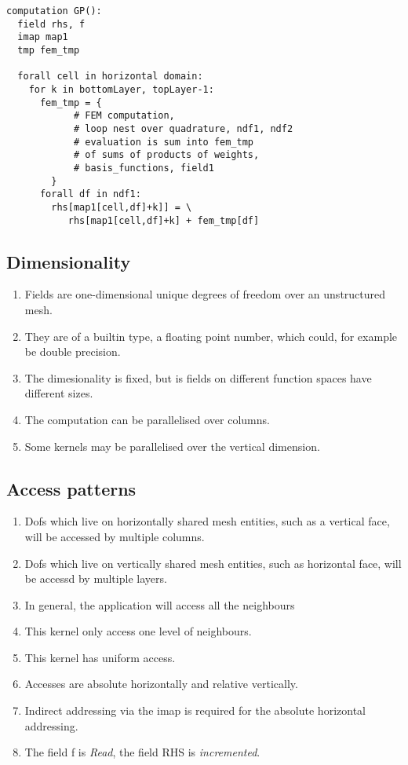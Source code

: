 \documentclass[a4paper,11pt]{report}
\begin{document}
\begin{lstlisting}[style=dsl]
computation GP():
  field rhs, f
  imap map1
  tmp fem_tmp

  forall cell in horizontal domain:
    for k in bottomLayer, topLayer-1:
      fem_tmp = {
            # FEM computation, 
            # loop nest over quadrature, ndf1, ndf2
            # evaluation is sum into fem_tmp
            # of sums of products of weights, 
            # basis_functions, field1
        }
      forall df in ndf1:
        rhs[map1[cell,df]+k]] = \ 
           rhs[map1[cell,df]+k] + fem_tmp[df]

\end{lstlisting}
\subsection{Dimensionality}
\begin{enumerate}
  \item Fields are one-dimensional unique degrees of freedom over an unstructured mesh.
  \item They are of a builtin type, a floating point number, which could, for example be double precision.
   \item The dimesionality is fixed, but is fields on different function spaces have different sizes.
   \item The computation can be parallelised over columns. 
   \item Some kernels may be parallelised over the vertical dimension.
\end{enumerate}

\subsection{Access patterns}
  \begin{enumerate}
     \item Dofs which live on horizontally shared mesh entities, such as a
       vertical face, will be accessed by multiple columns.
     \item Dofs which live on vertically shared mesh entities, such as
       horizontal face, will be accessd by multiple layers.
     \item In general, the application will access all the neighbours
     \item This kernel only access one level of neighbours.
     \item This kernel has uniform access.
     \item Accesses are absolute horizontally and relative vertically.
     \item Indirect addressing via the imap is required for the
       absolute horizontal addressing.
     \item The field f is {\em Read}, the field RHS is {\em incremented}.
  \end{enumerate}
\end{document}
